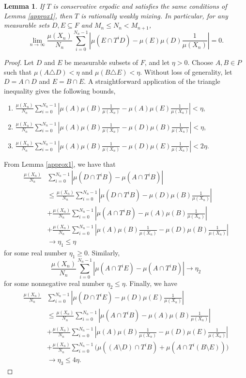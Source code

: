 \documentclass[12pt]{amsart}
\newtheorem{lemma}[theorem]{Lemma}
\begin{document}
\begin{lemma}
\label{approx2}
If $T$ is conservative ergodic and 
satisfies the same conditions of Lemma \ref{approx1}, 
then $T$ is rationally weakly mixing. 
In particular, for any measurable sets $D,E\subseteq F$ 
and $M_n \leq N_n < M_{n+1}$, 
\[
\lim_{n \to \infty} \frac{\mu (X_n)}{N_n} \sum_{i=0}^{N_n-1} 
| \mu (E\cap T^iD) - \mu (E) \mu (D) \frac{1}{\mu (X_n)} | = 0 . 
\]
\end{lemma}
\begin{proof}
Let $D$ and $E$ be measurable subsets of $F$, 
and let $\eta > 0$. 
Choose $A,B \in P$ such that 
$\mu (A\triangle D) < \eta$ and $\mu (B\triangle E) < \eta$. 
Without loss of generality, let 
$D=A\cap D$ and $E=B\cap E$. 
A straightforward application of the triangle inequality 
gives the following bounds,
\begin{enumerate}
\item $\frac{\mu(X_n)}{N_n} \sum_{i=0}^{N_n-1} 
| \mu(A)\mu(B)\frac{1}{\mu(X_n)} - \mu(A)\mu(E)\frac{1}{\mu(X_n)} | 
< \eta$,
\item $\frac{\mu(X_n)}{N_n} \sum_{i=0}^{N_n-1} 
| \mu(A)\mu(B)\frac{1}{\mu(X_n)} - \mu(D)\mu(B)\frac{1}{\mu(X_n)} | 
< \eta$,
\item $\frac{\mu(X_n)}{N_n} \sum_{i=0}^{N_n-1} 
| \mu(A)\mu(B)\frac{1}{\mu(X_n)} - \mu(D)\mu(E)\frac{1}{\mu(X_n)} | 
< 2\eta$. 
\end{enumerate}
From Lemma \ref{approx1}, we have that 
\begin{align}
\frac{\mu(X_n)}{N_n} & \sum_{i=0}^{N_n-1} 
| \mu(D\cap T^iB) - \mu(A\cap T^iB) | \\ 
& \leq \frac{\mu(X_n)}{N_n} \sum_{i=0}^{N_n-1} 
| \mu(D\cap T^iB) - \mu(D)\mu(B)\frac{1}{\mu(X_n)} | \\ 
& + \frac{\mu(X_n)}{N_n}  \sum_{i=0}^{N_n-1} 
| \mu(A\cap T^iB) - \mu(A)\mu(B)\frac{1}{\mu(X_n)} | \\ 
& + \frac{\mu(X_n)}{N_n} \sum_{i=0}^{N_n-1} 
| \mu(A)\mu(B)\frac{1}{\mu(X_n)} - \mu(D)\mu(B)\frac{1}{\mu(X_n)} | \\ 
&\longrightarrow \eta_1 \leq \eta 
\end{align}
for some real number $\eta_1 \geq 0$. 
Similarly, 
\[
\frac{\mu(X_n)}{N_n} \sum_{i=0}^{N_n-1} 
| \mu(A\cap T^iE) - \mu(A\cap T^iB) | \to \eta_2 
\]
for some nonnegative real number $\eta_2 \leq \eta$. 
Finally, we have 
\begin{align}
\frac{\mu(X_n)}{N_n} & \sum_{i=0}^{N_n-1} 
| \mu(D\cap T^iE) - \mu(D)\mu(E)\frac{1}{\mu(X_n)} | \\ 
&\leq \frac{\mu(X_n)}{N_n} \sum_{i=0}^{N_n-1} 
| \mu(A\cap T^iB) - \mu(A)\mu(B)\frac{1}{\mu(X_n)} | \\ 
&+ \frac{\mu(X_n)}{N_n} \sum_{i=0}^{N_n-1} 
| \mu(A)\mu(B)\frac{1}{\mu(X_n)} - \mu(D)\mu(E)\frac{1}{\mu(X_n)} | \\ 
&+ \frac{\mu(X_n)}{N_n} \sum_{i=0}^{N_n-1} \Big( 
\mu((A\setminus D)\cap T^iB) 
+ \mu(A\cap T^i(B\setminus E)) \Big) \\ 
&\longrightarrow \eta_3 \leq 4\eta . 
\end{align}
\end{proof}
\end{document}

